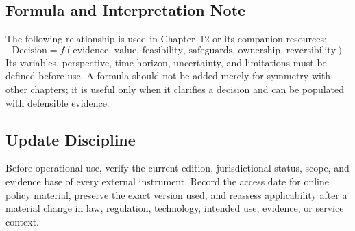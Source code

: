 \subsection{Formula and Interpretation Note}
The following relationship is used in Chapter~12 or its companion resources:
\begin{equation}
\text{Decision}=f(\text{evidence, value, feasibility, safeguards, ownership, reversibility})
\label{eq:comp-ch12-reference-formula}
\end{equation}
Its variables, perspective, time horizon, uncertainty, and limitations must be
defined before use. A formula should not be added merely for symmetry with other
chapters; it is useful only when it clarifies a decision and can be populated with
defensible evidence.

\subsection{Update Discipline}
Before operational use, verify the current edition, jurisdictional status, scope,
and evidence base of every external instrument. Record the access date for online
policy material, preserve the exact version used, and reassess applicability after a
material change in law, regulation, technology, intended use, evidence, or service
context.
